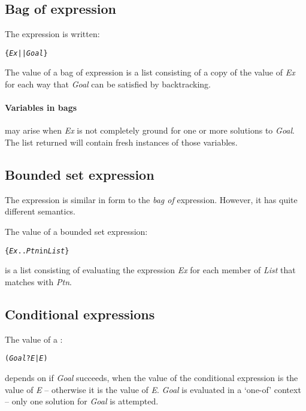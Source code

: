 \subsection{Bag of expression}
\label{expression:bagof}

The  expression is written:
\begin{alltt}
\{ \emph{Ex} || \emph{Goal} \}
\end{alltt}
The value of a bag of expression is a list consisting of a copy of the value of \emph{Ex} for each way that \emph{Goal} can be satisfied by backtracking.

\paragraph{Variables in bags}
may arise when \emph{Ex} is not completely ground for one or more solutions to \emph{Goal}. The list returned will contain fresh instances of those variables.

\subsection{Bounded set expression}
\label{expression:bounded}

The  expression is similar in form to the \emph{bag of} expression. However, it has quite different semantics.

The value of a bounded set expression:
\begin{alltt}
\{ \emph{Ex} .. \emph{Ptn} in \emph{List} \}
\end{alltt}
is a list consisting of evaluating the expression \emph{Ex} for each member of \emph{List} that matches with \emph{Ptn}.

\subsection{Conditional expressions}
\label{expression:conditional}

The value of a :
\begin{alltt}
(\emph{Goal}?\emph{E}|\emph{E})
\end{alltt}
depends on if \emph{Goal} succeeds, when the value of the conditional expression is the value of \emph{E} -- otherwise it is the value of \emph{E}. \emph{Goal} is evaluated in a `one-of' context -- only one solution for \emph{Goal} is attempted.

